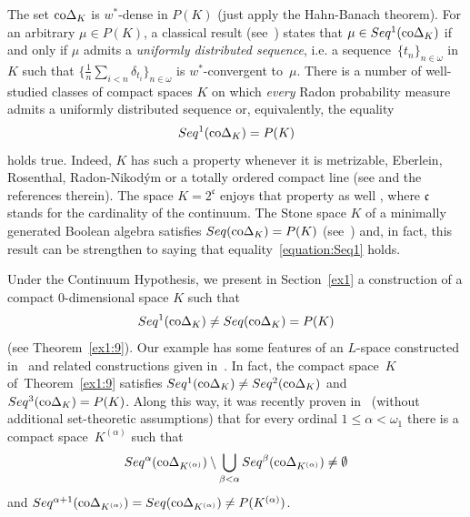 \documentclass[12pt]{amsart}
\newcommand{\sm}{\setminus}
\newcommand{\0}{\protect{\bf 0}}
\newcommand{\1}{\protect{\bf 1}}
\theoremstyle{definition}
\theoremstyle{remark}
\numberwithin{equation}{section}
\begin{document}
The set ${\rm co}\Delta_K$ is $w^*$-dense in $P(K)$ (just apply the Hahn-Banach theorem).  
For an arbitrary $\mu\in P(K)$, a classical result (see~\cite{nie}) states that 
$\mu \in Seq^1({\rm co}\Delta_K)$ if and only if $\mu$ admits a {\em uniformly distributed sequence}, i.e. a 
sequence~$\{t_n\}_{n\in \omega}$ in~$K$ such that 
$\{\frac{1}{n}\sum_{i<n} \delta_{t_i}\}_{n\in \omega}$ is $w^*$-convergent to~$\mu$.
There is a number of well-studied classes of compact spaces $K$ on which
{\em every} Radon probability measure admits a uniformly distributed sequence or, equivalently,
the equality
\begin{equation}\label{equation:Seq1}
	Seq^1({\rm co}\Delta_K)=P(K)
\end{equation}
holds true. Indeed, $K$ has such a property whenever it is
metrizable, Eberlein, Rosenthal, Radon-Nikod\'{y}m or
a totally ordered compact line (see \cite{mer-J} and the references therein). The space
$K=2^\mathfrak{c}$ enjoys that property as well \cite[491Q]{freMT-4}, where $\mathfrak{c}$ stands for the cardinality of the continuum.
The Stone space $K$ of a minimally generated Boolean algebra satisfies $Seq({\rm co}\Delta_K) = P(K)$ (see~\cite{bor-ple}) and, 
in fact, this result can be strengthen to saying that equality~\eqref{equation:Seq1} holds.

Under the Continuum Hypothesis, we present in Section~\ref{ex1} a construction of a compact $0$-dimensional space $K$ such that
$$ 
	Seq^1({\rm co}\Delta_K) \neq Seq({\rm co}\Delta_K) = P(K)
$$
(see Theorem~\ref{ex1:9}). Our example has some features of an $L$-space
constructed in~\cite{Ku81} and related constructions given in~\cite{Pl97}. 
In fact, the compact space~$K$ of~Theorem~\ref{ex1:9} satisfies 
$Seq^1({\rm co}\Delta_K) \neq Seq^2({\rm co}\Delta_K)$ and $Seq^3({\rm co}\Delta_K) = P(K)$.
Along this way, it was recently proven in~\cite{bor-sel} (without additional set-theoretic assumptions) that for every ordinal $1\leq \alpha<\omega_1$ there is
a compact space~$K^{(\alpha)}$ such that 
$$
	Seq^\alpha({\rm co}\Delta_{K^{(\alpha)}})\sm \bigcup_{\beta<\alpha}Seq^\beta({\rm co}\Delta_{K^{(\alpha)}})\neq \emptyset
$$
and $Seq^{\alpha+1}({\rm co}\Delta_{K^{(\alpha)}})=Seq({\rm co}\Delta_{K^{(\alpha)}})\neq P(K^{(\alpha)})$.
\end{document}

